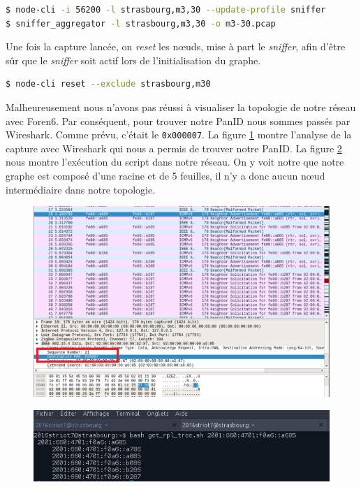 \documentclass[	DIV=calc,%
							paper=a4,%
							fontsize=11pt,%
			  ]{scrartcl}	 					%
\begin{document}
\begin{lstlisting}[language=bash]
$ node-cli -i 56200 -l strasbourg,m3,30 --update-profile sniffer
$ sniffer_aggregator -l strasbourg,m3,30 -o m3-30.pcap
\end{lstlisting}

Une fois la capture lancée, on \textit{reset} les nœuds, mise à part le \textit{sniffer}, afin d'être sûr que le \textit{sniffer} soit actif lors de l'initialisation du graphe.

\begin{lstlisting}[language=bash]
$ node-cli reset --exclude strasbourg,m30 
\end{lstlisting}

Malheureusement nous n'avons pas réussi à visualiser la topologie de notre réseau avec Foren6. Par conséquent, pour trouver notre PanID nous sommes passés par Wireshark. Comme prévu, c'était le \texttt{0x000007}.
La figure \ref{fig:wireshark} montre l'analyse de la capture avec Wireshark qui nous a permis de trouver notre PanID. La figure \ref{fig:script} nous montre l'exécution du script dans notre réseau. On y voit notre que notre graphe est composé d'une racine et de 5 feuilles, il n'y a donc aucun nœud intermédiaire dans notre topologie.

\begin{figure}
\centering
  \includegraphics[keepaspectratio,width=\linewidth]{img/pan_id_720}
  \label{fig:wireshark}
\end{figure}

\begin{figure}
\centering
  \includegraphics[keepaspectratio,width=\linewidth]{img/tree}
  \label{fig:script}
\end{figure}
\end{document}
